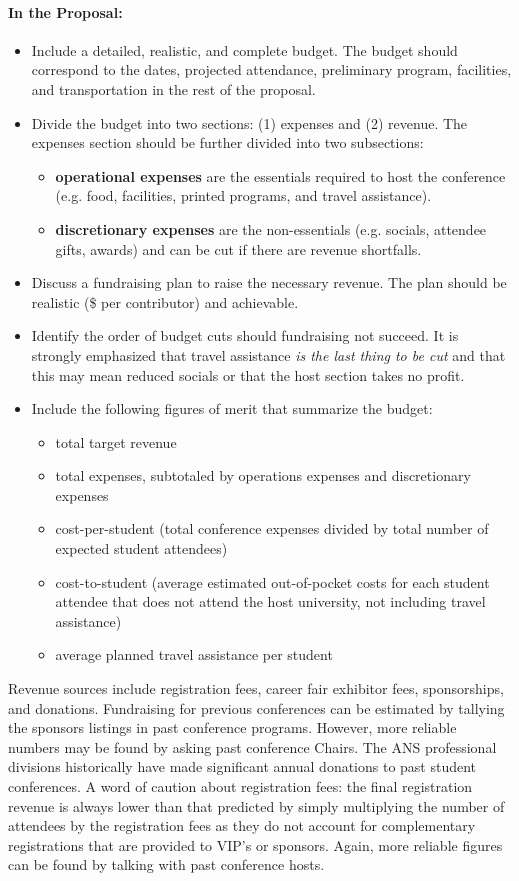 \documentclass[12pt]{article}
\begin{document}
\paragraph{In the Proposal:}
\begin{itemize}
\item{Include a detailed, realistic, and complete budget. The budget should correspond
to the dates, projected attendance, preliminary program, facilities, and
transportation in the rest of the proposal.}
\item{Divide the budget into two sections: (1) expenses and (2) revenue. The expenses
section should be further divided into two subsections:
\begin{itemize}
\item{\textbf{operational expenses} are the essentials required to host the conference (e.g.
food, facilities, printed programs, and travel assistance).}
\item{\textbf{discretionary expenses} are the non-essentials (e.g. socials, attendee gifts, awards) and can be cut if there are revenue shortfalls.}
\end{itemize}
}
\item{Discuss a fundraising plan to raise the necessary revenue. The plan should be
realistic (\$ per contributor) and achievable.}
\item{Identify the order of budget cuts should fundraising not succeed. It is strongly
emphasized that travel assistance \textit{is the last thing to be cut} and that this
may mean reduced socials or that the host section takes no profit.}
\item{Include the following figures of merit that summarize the budget:
\begin{itemize}
\item{total target revenue}
\item{total expenses, subtotaled by operations expenses and discretionary expenses}
\item{cost-per-student (total conference expenses divided by total number of
expected student attendees)}
\item{cost-to-student (average estimated out-of-pocket costs for each student
attendee that does not attend the host university, not including travel
assistance)}
\item{average planned travel assistance per student}
\end{itemize}
}
\end{itemize}

Revenue sources include registration fees, career fair exhibitor fees, sponsorships, and donations. 
Fundraising for previous conferences can be estimated by tallying the sponsors listings in past conference programs. However, more reliable numbers may be found by asking past conference Chairs.
The ANS professional divisions historically have made
significant annual donations to past student
 conferences.
A word of caution about registration fees: the final registration revenue is always lower than that predicted by simply multiplying the number of attendees by the registration fees as they do not account for complementary registrations that are provided to VIP's or sponsors. 
Again, more reliable figures can be found by talking with past conference hosts.
\end{document}
